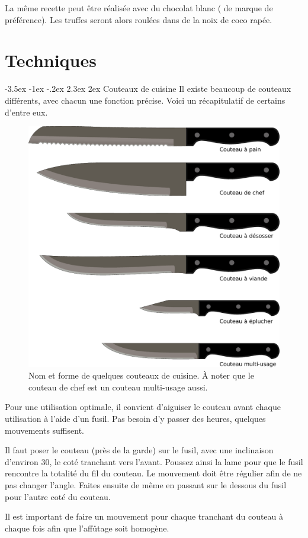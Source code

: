 \documentclass[a4paper,twoside]{report}
\makeatletter
\renewcommand{\section}{\@startsection{section}{1}{\z@}%
             {-3.5ex \@plus -1ex \@minus -.2ex}%
             {2.3ex \@plus 2ex}%
             {\normalfont\Large\scshape\bfseries\marou}}
\makeatother
\begin{document}
La même recette peut être réalisée avec du chocolat blanc ( de marque de préférence). Les truffes seront alors roulées dans de la noix de coco rapée.

\chapter{Techniques}
\minitoc

\section{Couteaux de cuisine}
Il existe beaucoup de couteaux différents, avec chacun une fonction précise. Voici un récapitulatif de certains d'entre eux.

\begin{figure}[htb]
\centering
\includegraphics[width=0.6\linewidth]{figures/couteaux.pdf}
\caption{Nom et forme de quelques couteaux de cuisine. À noter que le couteau de chef est un couteau multi-usage aussi.}
\end{figure}

\begin{remarque}
Pour une utilisation optimale, il convient d'aiguiser le couteau avant chaque utilisation à l'aide d'un fusil. Pas besoin d'y passer des heures, quelques mouvements suffisent.

Il faut poser le couteau (près de la garde) sur le fusil, avec une inclinaison d'environ 30\degre, le coté tranchant vers l'avant. Poussez ainsi la lame pour que le fusil rencontre la totalité du fil du couteau. Le mouvement doit être régulier afin de ne pas changer l'angle. Faites ensuite de même en passant sur le dessous du fusil pour l'autre coté du couteau.

Il est important de faire un mouvement pour chaque tranchant du couteau à chaque fois afin que l'affûtage soit homogène.
\end{remarque}
\end{document}
